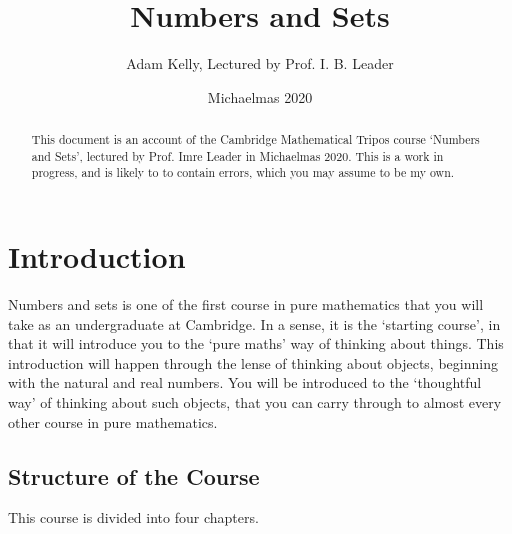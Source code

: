 \documentclass[a4]{scrartcl}
\title{Numbers and Sets}
\author{Adam Kelly, Lectured by Prof. I. B. Leader}
\date{Michaelmas 2020}
\begin{document}
\maketitle

\begin{abstract}
	This document is an account of the Cambridge Mathematical Tripos course `Numbers and Sets', lectured by Prof. Imre Leader in Michaelmas 2020.
	This is a work in progress, and is likely to to contain errors, which you may assume to be my own.
\end{abstract}

\tableofcontents

\clearpage
\section{Introduction}

Numbers and sets is one of the first course in pure mathematics that you will take
as an undergraduate at Cambridge. In a sense, it is the `starting course', in that it will introduce you to the `pure maths' way of thinking about things. 
This introduction will happen through the lense of thinking about objects, beginning with the natural and real numbers. You will be introduced to the `thoughtful way' of thinking about such objects, that you can carry through to almost every other course in pure mathematics.

\subsection{Structure of the Course}

This course is divided into four chapters.
\end{document}

